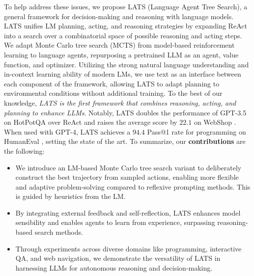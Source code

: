 \documentclass{article} \usepackage{iclr2024_conference,times}
\begin{document}
To help address these issues, we propose LATS (Language Agent Tree Search), a general framework for decision-making and reasoning with language models. LATS unifies LM planning, acting, and reasoning strategies by expanding ReAct \citep{yao2023react} into a search over a combinatorial space of possible reasoning and acting steps. We adapt Monte Carlo tree search (MCTS) from model-based reinforcement learning \citep{Silver2017MasteringTG, anthony2017thinking, jiang2018feedback} to language agents, repurposing a pretrained LLM as an agent, value function, and optimizer. Utilizing the strong natural language understanding and in-context learning ability of modern LMs, we use text as an interface between each component of the framework, allowing LATS to adapt planning to environmental conditions without additional training. To the best of our knowledge, \emph{LATS is the first framework that combines reasoning, acting, and planning to enhance LLMs}. Notably, LATS doubles the performance of GPT-3.5 on HotPotQA \citep{yang2018hotpotqa} over ReAct \citep{yao2023react} and raises the average score by $22.1$ on WebShop \citep{yao2022webshop}. When used with GPT-4, LATS achieves a $94.4$ Pass@1 rate for programming on HumanEval \citep{chen2021evaluating}, setting the state of the art. To summarize, our \textbf{contributions} are the following:
\vspace{-0.1in}
\begin{itemize}
    \item We introduce an LM-based Monte Carlo tree search variant to deliberately construct the best trajectory from sampled actions, enabling more flexible and adaptive problem-solving compared to reflexive prompting methods. This is guided by heuristics from the LM.
    \item By integrating external feedback and self-reflection, LATS enhances model sensibility and enables agents to learn from experience, surpassing reasoning-based search methods.
    \item Through experiments across diverse domains like programming, interactive QA, and web navigation, we demonstrate the versatility of LATS in harnessing LLMs for autonomous reasoning and decision-making.
\end{itemize}
\vspace{-0.07in}
\end{document}
